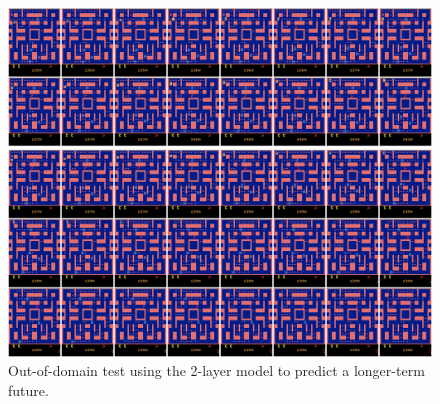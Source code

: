 \vspace{.3cm}
\begin{figure}[htpb]
	\centering
	\includegraphics[width=1.0\linewidth]{figures/pred/pac/full-long/pred-00.png} 
	\caption[Long-Term Prediction Sample on MsPacman]{Out-of-domain test using the 2-layer model to predict a longer-term future.} \label{fig:pac-pred-full-long}
\end{figure}



